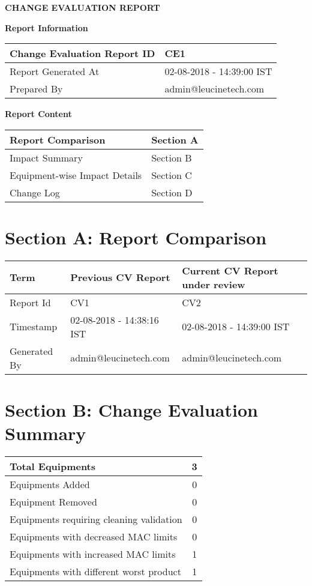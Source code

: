 \documentclass{article}
\begin{document}
\begin{center}
\textbf{CHANGE EVALUATION REPORT}
\end{center}
\noindent \textbf{Report Information}
\begin{longtable}[l]{|l| l|}\hline
Change Evaluation Report ID & CE1\\\hline
Report Generated At & 02-08-2018 - 14:39:00 IST \\\hline
Prepared By & admin@leucinetech.com\\\hline
\end{longtable}
\noindent \textbf{Report Content}
\begin{longtable}[l]{|l| l|}\hline
Report Comparison & Section A\\\hline
Impact Summary & Section B\\\hline
Equipment-wise Impact Details & Section C\\\hline
Change Log & Section D\\\hline
\end{longtable}
\section{Section A: Report Comparison}
\begin{longtable}[l]{|l| l| l| } \hline
Term & Previous CV Report & Current CV Report under review\\\hline
Report Id & CV1 & CV2\\\hline
Timestamp & 02-08-2018 - 14:38:16 IST & 02-08-2018 - 14:39:00 IST\\\hline
Generated By & admin@leucinetech.com & admin@leucinetech.com\\\hline
\end{longtable}
\section{Section B: Change Evaluation Summary}
\begin{longtable}[l]{|l|c|} \hline
Total Equipments& 3\\\hline
Equipments Added & 0\\\hline
Equipment Removed & 0\\\hline
Equipments requiring cleaning validation&0\\\hline
Equipments with decreased MAC limits&0\\\hline
Equipments with increased MAC limits&1\\\hline
Equipments with different worst product&1\\\hline
\end{longtable}
\newpage
\end{document}
